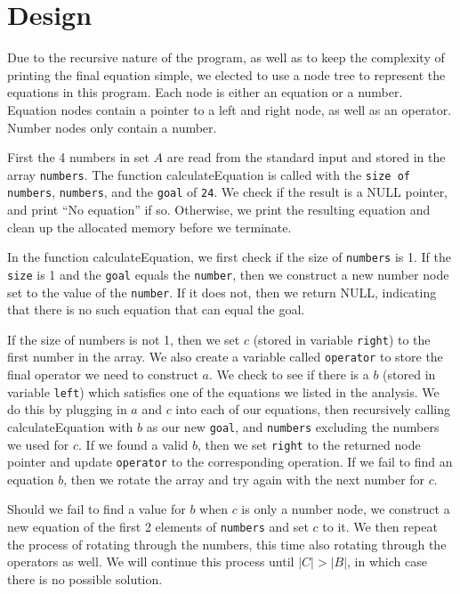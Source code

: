 \documentclass[a4paper,10pt]{article}
\begin{document}
\section{Design}
Due to the recursive nature of the program, as well as to keep the complexity of printing the final equation simple, we elected to use a node tree to represent the equations in this program. Each node is either an equation or a number. Equation nodes contain a pointer to a left and right node, as well as an operator. Number nodes only contain a number. 

First the 4 numbers in set $A$ are read from the standard input and stored in the array {\tt numbers}. The function calculateEquation is called with the {\tt size of numbers}, {\tt numbers}, and the {\tt goal} of {\tt 24}. We check if the result is a NULL pointer, and print “No equation” if so. Otherwise, we print the resulting equation and clean up the allocated memory before we terminate.

In the function calculateEquation, we first check if the size of {\tt numbers} is 1. If the {\tt size} is 1 and the {\tt goal} equals the {\tt number}, then we construct a new number node set to the value of the {\tt number}. If it does not, then we return NULL, indicating that there is no such equation that can equal the goal.

If the size of numbers is not 1, then we set $c$ (stored in variable {\tt right}) to the first number in the array. We also create a variable called {\tt operator} to store the final operator we need to construct $a$. We check to see if there is a $b$ (stored in variable {\tt left}) which satisfies one of the equations we listed in the analysis. We do this by plugging in $a$ and $c$ into each of our equations, then recursively calling calculateEquation with $b$ as our new {\tt goal}, and {\tt numbers} excluding the numbers we used for $c$. If we found a valid $b$, then we set {\tt right} to the returned node pointer and update {\tt operator} to the corresponding operation. If we fail to find an equation $b$, then we rotate the array and try again with the next number for $c$.

Should we fail to find a value for $b$ when $c$ is only a number node, we construct a new equation of the first 2 elements of {\tt numbers} and set $c$ to it. We then repeat the process of rotating through the numbers, this time also rotating through the operators as well. We will continue this process until $|C| > |B|$, in which case there is no possible solution.
\end{document}
